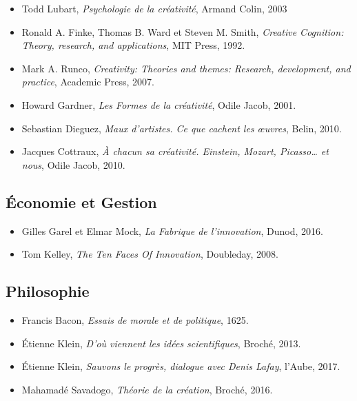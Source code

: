 \documentclass{article}
\begin{document}
\begin{itemize}

\item Todd Lubart, \textit{Psychologie de la créativité}, Armand Colin, 2003
\item Ronald A. Finke, Thomas B. Ward et Steven M. Smith, \textit{Creative Cognition: Theory, research, and applications}, MIT Press, 1992.
\item Mark A. Runco, \textit{Creativity: Theories and themes: Research, development, and practice}, Academic Press, 2007.
\item Howard Gardner, \textit{Les Formes de la créativité}, Odile Jacob, 2001.
\item Sebastian Dieguez, \textit{Maux d’artistes. Ce que cachent les œuvres}, Belin, 2010.
\item Jacques Cottraux, \textit{À chacun sa créativité. Einstein, Mozart, Picasso… et nous}, Odile Jacob, 2010.

\end{itemize}

\subsection{Économie et Gestion}

\begin{itemize}

\item Gilles Garel et Elmar Mock, \textit{La Fabrique de l'innovation}, Dunod, 2016.
\item Tom Kelley, \textit{The Ten Faces Of Innovation}, Doubleday, 2008.

\end{itemize}

\subsection{Philosophie}

\begin{itemize}

\item Francis Bacon, \textit{Essais de morale et de politique}, 1625.
\item Étienne Klein, \textit{D'où viennent les idées scientifiques}, Broché, 2013.
\item Étienne Klein, \textit{Sauvons le progrès, dialogue avec Denis Lafay}, l’Aube, 2017.
\item Mahamadé Savadogo, \textit{Théorie de la création}, Broché, 2016.	

\end{itemize}
\end{document}
